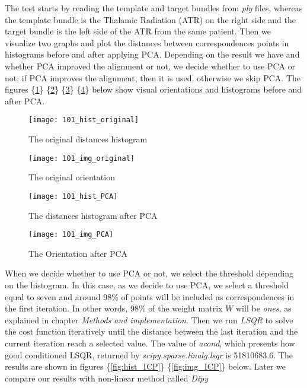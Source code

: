 \documentclass[../structure.tex]{subfiles}
\begin{document}
\hspace{2em}The test starts by reading the template and target bundles from \textit{ply} files, whereas the template bundle is the Thalamic Radiation (ATR) on the right side and the target bundle is the left side of the ATR from the same patient. Then we visualize two graphs and plot the distances between correspondences points in histograms before and after applying PCA. Depending on the result we have and whether PCA improved the alignment or not, we decide whether to use PCA or not; if PCA improves the alignment, then it is used, otherwise we skip PCA. The figures \{\ref{fig:hist_original}\} \{\ref{fig:img_original}\} \{\ref{fig:hist_PCA}\} \{\ref{fig:img_PCA}\} below show visual orientations and histograms before and after PCA.

\begin{figure}[h!]
\centering
\texttt{[image: 101\_hist\_original]}
\captionsetup{justification=centering}
\caption{The original distances histogram}
\label{fig:hist_original}
\end{figure}

\begin{figure}[h!]
\centering
\texttt{[image: 101\_img\_original]}
\captionsetup{justification=centering}
\caption{The original orientation}
\label{fig:img_original}
\end{figure}
\pagebreak
\vspace{4em}
\begin{figure}[h!]
\centering
\texttt{[image: 101\_hist\_PCA]}
\captionsetup{justification=centering}
\caption{The distances histogram after PCA}
\label{fig:hist_PCA}
\end{figure}

\begin{figure}[h!]
\centering
\texttt{[image: 101\_img\_PCA]}
\captionsetup{justification=centering}
\caption{The Orientation after PCA}
\label{fig:img_PCA}
\end{figure}
\vspace{4em}
\pagebreak
When we decide whether to use PCA or not, we select the threshold depending on the histogram. In this case, as we decide to use PCA, we select a threshold equal to seven and around 98\% of points will be included as correspondences in the first iteration. In other words, 98\% of the weight matrix $W$ will be \textit{ones}, as explained in chapter \textit{Methods and implementation}. Then we run \textit{LSQR} to solve the cost function iteratively until the distance between the last iteration and the current iteration reach a selected value. The value of \textit{acond}, which presents how good conditioned LSQR, returned by \textit{scipy.sparse.linalg.lsqr} is 51810683.6. The results are shown in figures \{\ref{fig:hist_ICP}\} \{\ref{fig:img_ICP}\} below. Later we compare our results with non-linear method called \textit{Dipy} 
\end{document}
